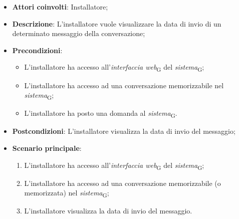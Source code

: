 \begin{itemize}
    \item \textbf{Attori coinvolti}: Installatore;
    \item \textbf{Descrizione}: L'installatore vuole visualizzare la data di invio di un determinato messaggio della conversazione;
    \item \textbf{Precondizioni}:  
    \begin{itemize}
        \item L’installatore ha accesso all’\textit{interfaccia web}\textsubscript{G} del \textit{sistema}\textsubscript{G};
        \item L’installatore ha accesso ad una conversazione memorizzabile nel \textit{sistema}\textsubscript{G};
        \item L'installatore ha posto una domanda al \textit{sistema}\textsubscript{G}.
    \end{itemize}
    \item \textbf{Postcondizioni}: L'installatore visualizza la data di invio del messaggio;
    \item \textbf{Scenario principale}:
    \begin{enumerate}
        \item L’installatore ha accesso all’\textit{interfaccia web}\textsubscript{G} del \textit{sistema}\textsubscript{G};
        \item L’installatore ha accesso ad una conversazione memorizzabile (o memorizzata) nel \textit{sistema}\textsubscript{G};
        \item L'installatore visualizza la data di invio del messaggio.
    \end{enumerate}
\end{itemize}

